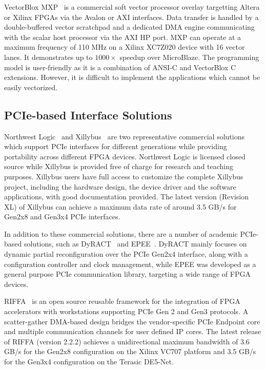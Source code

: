 VectorBlox MXP~\cite{severance2013embedded} is a commercial soft vector processor overlay targetting Altera or Xilinx FPGAs via the Avalon or AXI interfaces. 
Data transfer is handled by a double-buffered vector scratchpad and a dedicated DMA engine communicating with the scalar host processor via the AXI HP port. 
MXP can operate at a maximum frequency of 110 MHz on a Xilinx XC7Z020 device with 16 vector lanes. 
It demonstrates up to $1000\times$ speedup over MicroBlaze. 
The programming model is user-friendly as it is a combination of ANSI-C and VectorBlox C extensions.  
However, it is difficult to implement the applications which cannot be easily vectorized. 


\subsection{PCIe-based Interface Solutions} 
Northwest Logic~\cite{nwlogic2018} and Xillybus~\cite{xillybus2018} are two representative commercial solutions which support PCIe interfaces for different generations while providing portability across different FPGA devices. 
Northwest Logic is licensed closed source while Xillybus is provided free of charge for research and teaching purposes. 
Xillybus users have full access to customize the complete Xillybus project, including the hardware design, the device driver and the software applications, with good documentation provided.
The latest version (Revision XL) of Xillybus  can achieve a maximum data rate of around 3.5 GB/s for Gen2x8 and Gen3x4 PCIe interfaces.

In addition to these commercial solutions, there are a number of academic PCIe-based solutions, such as DyRACT~\cite{vipin2014dyract} and EPEE~\cite{gong2014efficient}.
DyRACT mainly focuses on dynamic partial reconfiguration over the PCIe Gen2x4 interface, along with a configuration controller and clock management, while EPEE was developed as a general purpose PCIe communication library, targeting a wide range of FPGA devices. 

RIFFA~\cite{jacobsen2015riffa} is an open source reusable framework for the integration of FPGA accelerators with workstations supporting PCIe Gen 2 and Gen3 protocols. 
A scatter-gather DMA-based design bridges the vendor-specific PCIe Endpoint core and multiple communication channels for user defined IP cores. 
The latest release of RIFFA (version 2.2.2) achieves a unidirectional maximum bandwidth of 3.6 GB/s for the Gen2x8 configuration on the Xilinx VC707 platform and 3.5 GB/s for the Gen3x4 configuration on the Terasic DE5-Net.

